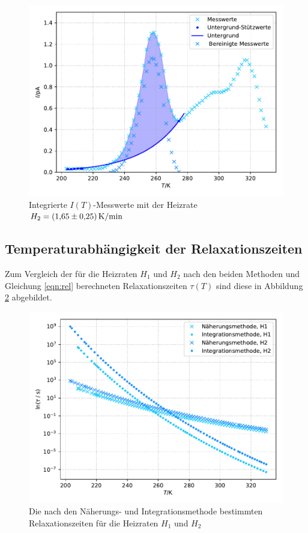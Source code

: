 \begin{figure}[H]
  \centering
  \includegraphics[scale=0.7]{content/plot4.pdf}
  \caption{Integrierte $I(T)$-Messwerte mit der Heizrate $H_2 = \SI{1.65 +- 0.25}{\kelvin\per\minute}$}
  \label{fig:plot4}
\end{figure}

\subsection{Temperaturabhängigkeit der Relaxationszeiten}

Zum Vergleich der für die Heizraten $H_1$ und $H_2$ nach den beiden Methoden und Gleichung \eqref{eqn:rel} berechneten 
Relaxationszeiten $\tau(T)$ sind diese in Abbildung \ref{fig:plot5} abgebildet.

\begin{figure}[H]
  \centering
  \includegraphics[scale=0.65]{content/plot5.pdf}
  \caption{Die nach den Näherungs- und Integrationsmethode bestimmten Relaxationszeiten für die Heizraten $H_1$ und $H_2$}
  \label{fig:plot5}
\end{figure}



